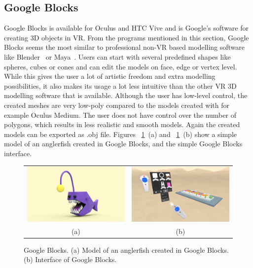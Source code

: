 \subsection{Google Blocks}
Google Blocks is available for Oculus and HTC Vive and is Google's software for creating 3D objects in VR. From the programs mentioned in this section, Google Blocks seems the most similar to professional non-VR based modelling software like Blender~\cite{Blender} or Maya~\cite{Maya}. Users can start with several predefined shapes like spheres, cubes or cones and can edit the models on face, edge or vertex level. While this gives the user a lot of artistic freedom and extra modelling possibilities, it also makes its usage a lot less intuitive than the other VR 3D modelling software that is available. Although the user has low-level control, the created meshes are very low-poly compared to the models created with for example Oculus Medium. The user does not have control over the number of polygons, which results in less realistic and smooth models. Again the created models can be exported as .obj file. Figures ~\ref{fig:blocks}~(a) and ~\ref{fig:blocks}~(b) show a simple model of an anglerfish created in Google Blocks, and the simple Google Blocks interface.

\begin{figure}[!h]
    \centering
    \setlength{\tabcolsep}{0.0130\linewidth}
    \begin{tabular}{@{}cc@{}}
   	\includegraphics[width=0.487\linewidth]{figures/blocks_anglerfish}&
   	\includegraphics[width=0.487\linewidth]{figures/blocks_interface}\\
    (a)&(b)\\
    \end{tabular}
    \caption[Google Blocks]{Google Blocks.
    	  \textup{(a)} Model of an anglerfish created in Google Blocks.
			  \textup{(b)} Interface of Google Blocks. 
      \label{fig:blocks}}
\end{figure}